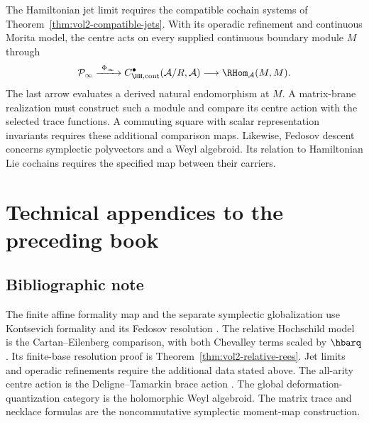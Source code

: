 The Hamiltonian jet limit requires the compatible cochain systems of
Theorem~\ref{thm:vol2-compatible-jets}.
With its operadic refinement and continuous Morita model, the centre acts
on every supplied continuous boundary module $M$ through
\[
 \mathcal P_\infty
 \xrightarrow{\ \Phi_\infty\ }
 C^\bullet_{\HH,\mathrm{cont}}(\mathcal A/R,\mathcal A)
 \longrightarrow\RHom_{\mathcal A}(M,M).
\]
The last arrow evaluates a derived natural endomorphism at $M$.
A matrix-brane realization must construct such a module and compare its
centre action with the selected trace functions.
A commuting square with scalar representation invariants requires these
additional comparison maps.
Likewise, Fedosov descent concerns symplectic polyvectors and a Weyl algebroid.
Its relation to Hamiltonian Lie cochains requires the specified map between their carriers.

\part{Technical appendices to the preceding book}
\chapter{Bibliographic note}
The finite affine formality map and the separate symplectic globalization use Kontsevich formality and its Fedosov resolution \cite{KontsevichDQ,DolgushevCov,CalaqueDolgushevHalbout}.  The relative Hochschild model is the Cartan--Eilenberg comparison, with both Chevalley terms scaled by $\hbarq$.  Its finite-base resolution proof is Theorem~\ref{thm:vol2-relative-rees}.  Jet limits and operadic refinements require the additional data stated above.  The all-arity centre action is the Deligne--Tamarkin brace action \cite{McClureSmith,KontsevichSoibelmanDeligne}.  The global deformation-quantization category is the holomorphic Weyl algebroid.  The matrix trace and necklace formulas are the noncommutative symplectic moment-map construction.
